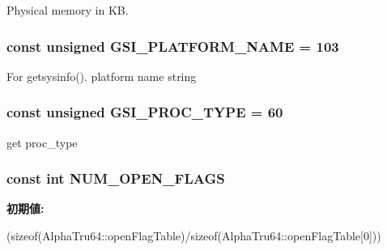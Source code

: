 Physical memory in KB. \hypertarget{classAlphaTru64_ac2412600f242b3062b887ef0ec4b4908}{
\subsubsection[{GSI\_\-PLATFORM\_\-NAME}]{\setlength{\rightskip}{0pt plus 5cm}const unsigned {\bf GSI\_\-PLATFORM\_\-NAME} = 103}}
\label{classAlphaTru64_ac2412600f242b3062b887ef0ec4b4908}


For getsysinfo(). platform name string \hypertarget{classAlphaTru64_a3048b7c97d8a7e86854cdb73520560d0}{
\subsubsection[{GSI\_\-PROC\_\-TYPE}]{\setlength{\rightskip}{0pt plus 5cm}const unsigned {\bf GSI\_\-PROC\_\-TYPE} = 60}}
\label{classAlphaTru64_a3048b7c97d8a7e86854cdb73520560d0}


get proc\_\-type \hypertarget{classAlphaTru64_ad85b9918c8f2c8739537a002dc1dc526}{
\subsubsection[{NUM\_\-OPEN\_\-FLAGS}]{\setlength{\rightskip}{0pt plus 5cm}const int {\bf NUM\_\-OPEN\_\-FLAGS}}}
\label{classAlphaTru64_ad85b9918c8f2c8739537a002dc1dc526}
{\bfseries 初期値:}
\begin{DoxyCode}

        (sizeof(AlphaTru64::openFlagTable)/sizeof(AlphaTru64::openFlagTable[0]))
\end{DoxyCode}


